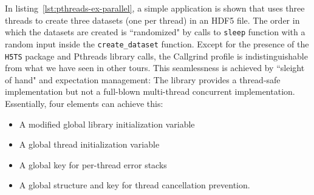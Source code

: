 






In listing~\ref{lst:pthreads-ex-parallel}, a simple application is shown that uses three threads to create three datasets (one per thread) in an HDF5 file. The order in which the datasets are created is ``randomized" by calls to \texttt{sleep} function with a random input inside the \texttt{create\_dataset} function. Except for the presence of the \texttt{H5TS} package and Pthreads library calls, the Callgrind profile is indistinguishable from what we have seen in other tours. This seamlessness is achieved by ``sleight of hand" and expectation management: The library provides a thread-safe implementation but not a full-blown multi-thread concurrent implementation. Essentially, four elements can achieve this:
\begin{itemize}
    \item A modified global library initialization variable
    \item A global thread initialization variable
    \item A global key for per-thread error stacks
    \item A global structure and key for thread cancellation prevention.
\end{itemize}


